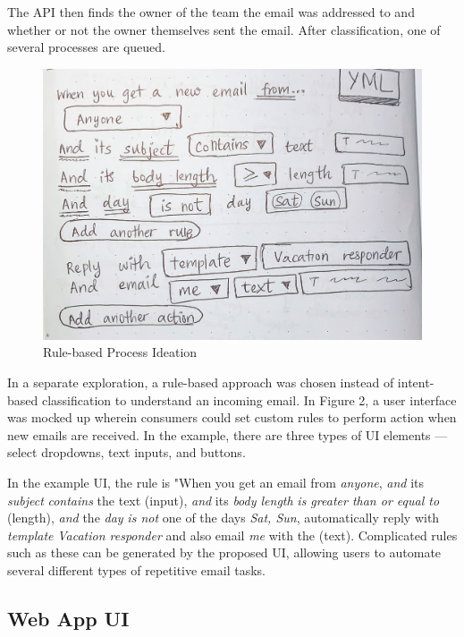 \documentclass{article}
\begin{document}
The API then finds the owner of the team the email was addressed to and whether or not the owner themselves sent the email. After classification, one of several processes are queued.

\begin{figure}\centering
	\includegraphics[scale=0.092]{drawing-rules-ui.jpg}
	\caption{Rule-based Process Ideation}
\end{figure}

In a separate exploration, a rule-based approach was chosen instead of intent-based classification to understand an incoming email. In Figure 2, a user interface was mocked up wherein consumers could set custom rules to perform action when new emails are received. In the example, there are three types of UI elements --- select dropdowns, text inputs, and buttons.

In the example UI, the rule is "When you get an email from \emph{anyone}, \emph{and} its \emph{subject} \emph{contains} the text (input), \emph{and} its \emph{body length} \emph{is greater than or equal to} (length), \emph{and} the \emph{day} \emph{is not} one of the days \emph{Sat, Sun}, automatically reply with \emph{template} \emph{Vacation responder} and also email \emph{me} with the (text). Complicated rules such as these can be generated by the proposed UI, allowing users to automate several different types of repetitive email tasks.

\subsection{Web App UI}
\end{document}
